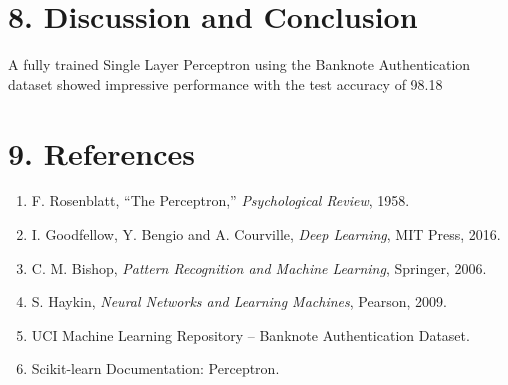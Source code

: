 \documentclass[11pt]{article}
\begin{document}

\section*{8. Discussion and Conclusion}

A fully trained Single Layer Perceptron using the Banknote Authentication dataset showed impressive performance with the test accuracy of 98.18 %


\section*{9. References}

\begin{enumerate}
\item F. Rosenblatt, ``The Perceptron,'' \emph{Psychological Review}, 1958.
\item I. Goodfellow, Y. Bengio and A. Courville, \emph{Deep Learning}, MIT Press, 2016.
\item C. M. Bishop, \emph{Pattern Recognition and Machine Learning}, Springer, 2006.
\item S. Haykin, \emph{Neural Networks and Learning Machines}, Pearson, 2009.
\item UCI Machine Learning Repository -- Banknote Authentication Dataset.
\item Scikit-learn Documentation: Perceptron.
\end{enumerate}
\end{document}
